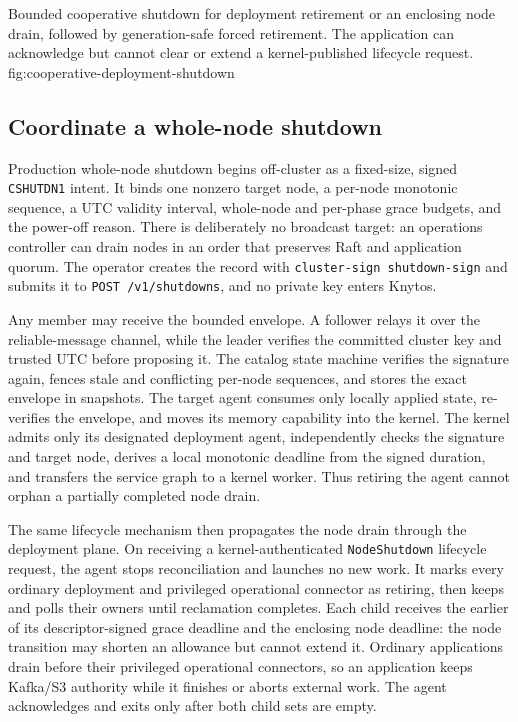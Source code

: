     {Bounded cooperative shutdown for deployment retirement or an enclosing
    node drain, followed by generation-safe forced retirement. The application
    can acknowledge but cannot clear or extend a kernel-published lifecycle
    request.}
    {fig:cooperative-deployment-shutdown}

\subsection{Coordinate a whole-node shutdown}

Production whole-node shutdown begins off-cluster as a fixed-size, signed
\texttt{CSHUTDN1} intent. It binds one nonzero target node, a per-node
monotonic sequence, a UTC validity interval, whole-node and per-phase grace
budgets, and the power-off reason. There is deliberately no broadcast target:
an operations controller can drain nodes in an order that preserves Raft and
application quorum. The operator creates the record with
\texttt{cluster-sign shutdown-sign} and submits it to
\texttt{POST /v1/shutdowns}, and no private key enters Knytos.

Any member may receive the bounded envelope. A follower relays it over the
reliable-message channel, while the leader verifies the committed cluster key
and trusted UTC before proposing it. The catalog state machine verifies the
signature again, fences stale and conflicting per-node sequences, and stores
the exact envelope in snapshots. The target agent consumes only locally
applied state, re-verifies the envelope, and moves its memory capability into
the kernel. The kernel admits only its designated deployment agent,
independently checks the signature and target node, derives a local monotonic
deadline from the signed duration, and transfers the service graph to a kernel
worker. Thus retiring the agent cannot orphan a partially completed node
drain.

The same lifecycle mechanism then propagates the node drain through the deployment plane.
On receiving a kernel-authenticated \texttt{NodeShutdown} lifecycle request,
the agent stops reconciliation and launches no new work. It marks every
ordinary deployment and privileged operational connector as retiring, then
keeps and polls their owners until reclamation completes. Each child receives
the earlier of its descriptor-signed grace deadline and the enclosing node
deadline: the node transition may shorten an allowance but cannot extend it.
Ordinary applications drain before their privileged operational connectors,
so an application keeps Kafka/S3 authority while it finishes or aborts
external work. The agent acknowledges and exits only after both child sets are
empty.

